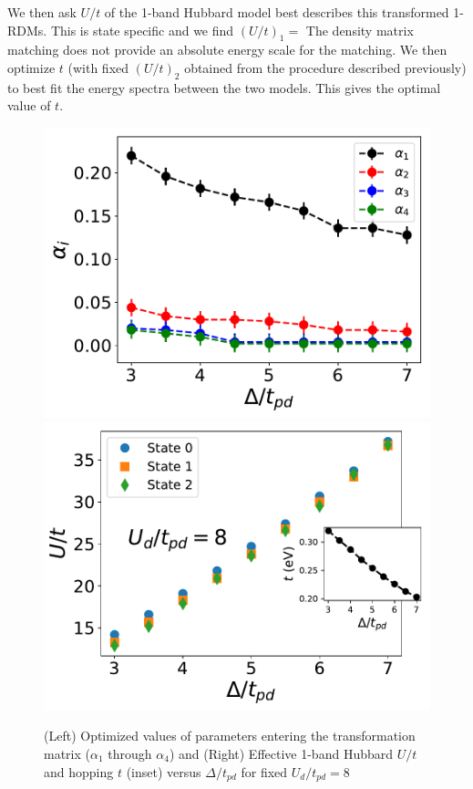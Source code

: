 We then ask $U/t$ of the 1-band Hubbard model best describes this transformed 
1-RDMs. This is state specific and we find $(U/t)_1 = $ 
The density matrix matching does not provide an absolute energy scale for the matching. 
We then optimize $t$ (with fixed $(U/t)_2$ obtained from the procedure described 
previously) to best fit the energy spectra between the two models. This gives the optimal value of 
$t$. 


\begin{figure}[]
\centering
\includegraphics[width=0.49\linewidth]{./Figures/Hyb_vs_ep_Ud_8.pdf}
\includegraphics[width=0.49\linewidth]{./Figures/U_and_hopping_combined_vs_ep_Ud_8.pdf}
\caption{(Left) Optimized values of parameters entering the transformation matrix 
($\alpha_1$ through $\alpha_4$) and (Right) Effective 1-band Hubbard $U/t$ and hopping $t$ (inset) 
versus $\Delta/t_{pd}$ for fixed $U_{d}/t_{pd}=8$}
\label{fig:hamfitepdvary} 
\end{figure}	

